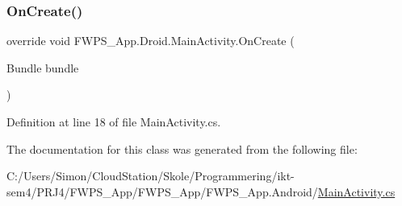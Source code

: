 \subsubsection{\texorpdfstring{On\+Create()}{OnCreate()}}
{\footnotesize\ttfamily override void F\+W\+P\+S\+\_\+\+App.\+Droid.\+Main\+Activity.\+On\+Create (\begin{DoxyParamCaption}\item[{Bundle}]{bundle }\end{DoxyParamCaption})\hspace{0.3cm}{\ttfamily [protected]}}



Definition at line 18 of file Main\+Activity.\+cs.



The documentation for this class was generated from the following file\+:\begin{DoxyCompactItemize}
\item 
C\+:/\+Users/\+Simon/\+Cloud\+Station/\+Skole/\+Programmering/ikt-\/sem4/\+P\+R\+J4/\+F\+W\+P\+S\+\_\+\+App/\+F\+W\+P\+S\+\_\+\+App/\+F\+W\+P\+S\+\_\+\+App.\+Android/\mbox{\hyperlink{_main_activity_8cs}{Main\+Activity.\+cs}}\end{DoxyCompactItemize}
